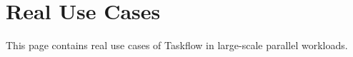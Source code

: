 \chapter{Real Use Cases}
\hypertarget{usecases}{}\label{usecases}
This page contains real use cases of Taskflow in large-\/scale parallel workloads.


\begin{DoxyItemize}
\item {}
\item {} 
\end{DoxyItemize}

